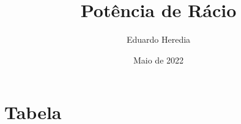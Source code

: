 \documentclass[a4paper]{article}
\title{Potência de Rácio}
\author{Eduardo Heredia}
\date{Maio de 2022}
\begin{document}
    \maketitle

    \section{Tabela}

        
\end{document}
